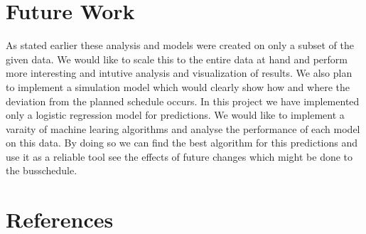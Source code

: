 \documentclass[12pt]{article}\usepackage[]{graphicx}\usepackage[]{color}
\begin{document}
\section{Future Work}
As stated earlier these analysis and models were created on only a subset of the given data. We would like to scale this to the entire data at hand and perform  more interesting and intutive analysis and visualization of results. We also plan to implement a simulation model which would clearly show how and where the deviation from the planned schedule occurs. In this project we have implemented only a logistic regression model for predictions. We would like to implement a varaity of machine learing algorithms and analyse the performance of each model on this data. By doing so we can find the best algorithm for this predictions and use it as a reliable tool see the effects of future changes which might be done to the busschedule.   

\section{References}
 
	
\end{document}
